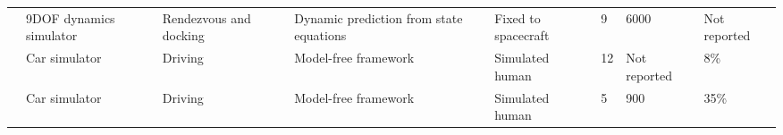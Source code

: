 \begin{wraptable}{r}{0.45\textwidth}
{{\begin{tabular}{@{}llllllll@{}}
\cite{Zhang2017}         & 9DOF dynamics simulator   & Rendezvous and docking     & Dynamic prediction from state equations  & Fixed to spacecraft & 9            & 6000           & Not reported         \\
\cite{Lu2018}            & Car simulator             & Driving                    & Model-free framework                     & Simulated human     & 12           & Not reported   & 8\%                  \\
\cite{Zheng2016}         & Car simulator             & Driving                    & Model-free framework                     & Simulated human     & 5            & 900            & 35\%                 \\ \bottomrule
\end{tabular}
}
}
\end{wraptable}